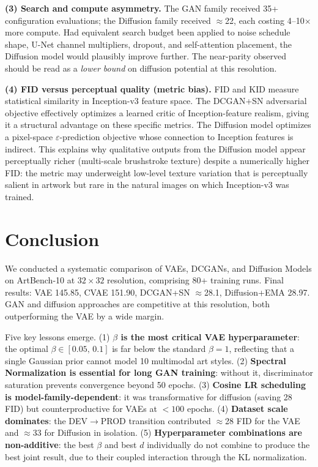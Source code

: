 \documentclass[runningheads]{llncs}
\begin{document}
\noindent\textbf{(3) Search and compute asymmetry.}
The GAN family received 35+ configuration evaluations; the Diffusion family
received $\approx$22, each costing 4--10$\times$ more compute. Had equivalent
search budget been applied to noise schedule shape, U-Net channel multipliers,
dropout, and self-attention placement, the Diffusion model would plausibly
improve further. The near-parity observed should be read as a \emph{lower
bound} on diffusion potential at this resolution.

\noindent\textbf{(4) FID versus perceptual quality (metric bias).}
FID and KID measure statistical similarity in Inception-v3 feature space.
The DCGAN+SN adversarial objective effectively optimizes a learned critic of
Inception-feature realism, giving it a structural advantage on these specific
metrics. The Diffusion model optimizes a pixel-space $\varepsilon$-prediction
objective whose connection to Inception features is indirect. This explains
why qualitative outputs from the Diffusion model appear perceptually richer
(multi-scale brushstroke texture) despite a numerically higher FID: the metric
may underweight low-level texture variation that is perceptually salient in
artwork but rare in the natural images on which Inception-v3 was trained.

\section{Conclusion}\label{sec:conclusion}

We conducted a systematic comparison of VAEs, DCGANs, and Diffusion Models on ArtBench-10 at $32{\times}32$ resolution, comprising 80+ training runs. Final results: VAE 145.85, CVAE 151.90, DCGAN+SN $\approx$28.1, Diffusion+EMA 28.97. GAN and diffusion approaches are competitive at this resolution, both outperforming the VAE by a wide margin.

Five key lessons emerge. (1) \textbf{$\beta$ is the most critical VAE hyperparameter}: the optimal $\beta \in [0.05,\,0.1]$ is far below the standard $\beta=1$, reflecting that a single Gaussian prior cannot model 10 multimodal art styles. (2) \textbf{Spectral Normalization is essential for long GAN training}: without it, discriminator saturation prevents convergence beyond 50 epochs. (3) \textbf{Cosine LR scheduling is model-family-dependent}: it was transformative for diffusion (saving 28 FID) but counterproductive for VAEs at $<100$ epochs. (4) \textbf{Dataset scale dominates}: the DEV$\to$PROD transition contributed $\approx$28 FID for the VAE and $\approx$33 for Diffusion in isolation. (5) \textbf{Hyperparameter combinations are non-additive}: the best $\beta$ and best $d$ individually do not combine to produce the best joint result, due to their coupled interaction through the KL normalization.
\end{document}
